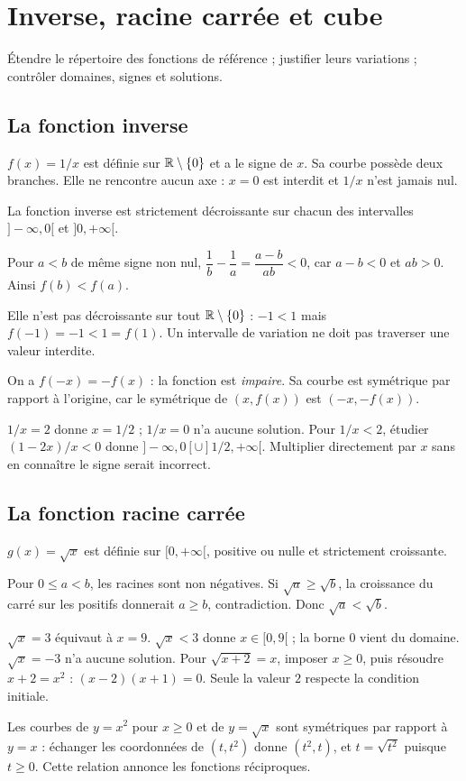 \documentclass[../cours_2de.tex]{subfiles}
\begin{document}
\setcounter{chapter}{14}
\chapter{Inverse, racine carrée et cube}
\label{sec:ch15}
\begin{objectif}
Étendre le répertoire des fonctions de référence ; justifier leurs variations ; contrôler domaines, signes et solutions.
\end{objectif}
\section{La fonction inverse}
$f(x)=1/x$ est définie sur $\mathbb{R}\setminus\{0\}$ et a le signe de $x$.
Sa courbe possède deux branches. Elle ne rencontre aucun axe : $x=0$ est interdit et $1/x$ n'est jamais nul.
\begin{theoreme}
La fonction inverse est strictement décroissante sur chacun des intervalles $]-\infty,0[$ et $]0,+\infty[$.
\end{theoreme}
\begin{demonstration}
Pour $a<b$ de même signe non nul,
$\dfrac1b-\dfrac1a=\dfrac{a-b}{ab}<0$, car $a-b<0$ et $ab>0$.
Ainsi $f(b)<f(a)$.
\end{demonstration}
\begin{attention}
Elle n'est pas décroissante sur tout $\mathbb{R}\setminus\{0\}$ : $-1<1$ mais $f(-1)=-1<1=f(1)$.
Un intervalle de variation ne doit pas traverser une valeur interdite.
\end{attention}
On a $f(-x)=-f(x)$ : la fonction est \emph{impaire}. Sa courbe est symétrique par rapport à l'origine, car le symétrique de $(x,f(x))$ est $(-x,-f(x))$.
\begin{exemple}
$1/x=2$ donne $x=1/2$ ; $1/x=0$ n'a aucune solution.
Pour $1/x<2$, étudier $(1-2x)/x<0$ donne
$]-\infty,0[\cup]1/2,+\infty[$.
Multiplier directement par $x$ sans en connaître le signe serait incorrect.
\end{exemple}
\section{La fonction racine carrée}
$g(x)=\sqrt x$ est définie sur $[0,+\infty[$, positive ou nulle et strictement croissante.
\begin{demonstration}
Pour $0\leq a<b$, les racines sont non négatives.
Si $\sqrt a\geq\sqrt b$, la croissance du carré sur les positifs donnerait $a\geq b$, contradiction.
Donc $\sqrt a<\sqrt b$.
\end{demonstration}
\begin{exemple}
$\sqrt x=3$ équivaut à $x=9$.
$\sqrt x<3$ donne $x\in[0,9[$ ; la borne $0$ vient du domaine.
$\sqrt x=-3$ n'a aucune solution.
Pour $\sqrt{x+2}=x$, imposer $x\geq0$, puis résoudre $x+2=x^2$ :
$(x-2)(x+1)=0$. Seule la valeur $2$ respecte la condition initiale.
\end{exemple}
\approfondissement Les courbes de $y=x^2$ pour $x\geq0$ et de $y=\sqrt x$ sont symétriques par rapport à $y=x$ : échanger les coordonnées de $(t,t^2)$ donne $(t^2,t)$, et $t=\sqrt{t^2}$ puisque $t\geq0$. Cette relation annonce les fonctions réciproques.
\end{document}
